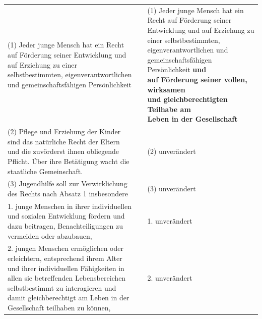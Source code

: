 \documentclass[10pt,a4paper,landscape]{article}
\begin{document}
\begin{longtable}{|L{8.2cm}|L{8.2cm}|L{8.2cm}|}
(1) Jeder junge Mensch hat ein Recht auf  \newline Förderung seiner Entwicklung und auf  \newline Erziehung zu einer selbstbestimmten,  \newline eigenverantwortlichen und  \newline gemeinschaftsfähigen Persönlichkeit &  & (1) Jeder junge Mensch hat ein Recht auf  \newline Förderung seiner Entwicklung und auf  \newline Erziehung zu einer selbstbestimmten,  \newline eigenverantwortlichen und  \newline gemeinschaftsfähigen Persönlichkeit \textbf{\textcolor{diffgreen}{und  \newline auf Förderung seiner vollen, wirksamen  \newline und gleichberechtigten Teilhabe am  \newline Leben in der Gesellschaft}} \\
\hhline{|---|}
(2) Pflege und Erziehung der Kinder sind  \newline das natürliche Recht der Eltern und die  \newline zuvörderst ihnen obliegende Pflicht. Über  \newline ihre Betätigung wacht die staatliche  \newline Gemeinschaft. &  & (2) unverändert \\
\hhline{|---|}
(3) Jugendhilfe soll zur Verwirklichung des  \newline Rechts nach Absatz 1 insbesondere &  & (3) unverändert \\
\hhline{|---|}
1. junge Menschen in ihrer individuellen  \newline und sozialen Entwicklung fördern und dazu  \newline beitragen, Benachteiligungen zu vermeiden  \newline oder abzubauen, &  & 1. unverändert \\
\hhline{|---|}
2. jungen Menschen ermöglichen oder  \newline erleichtern, entsprechend ihrem Alter und  ihrer individuellen Fähigkeiten in allen sie  \newline betreffenden Lebensbereichen  \newline selbstbestimmt zu interagieren und damit  \newline gleichberechtigt am Leben in der  \newline Gesellschaft teilhaben zu können, &  & 2. unverändert \\

\end{longtable}
\end{document}
